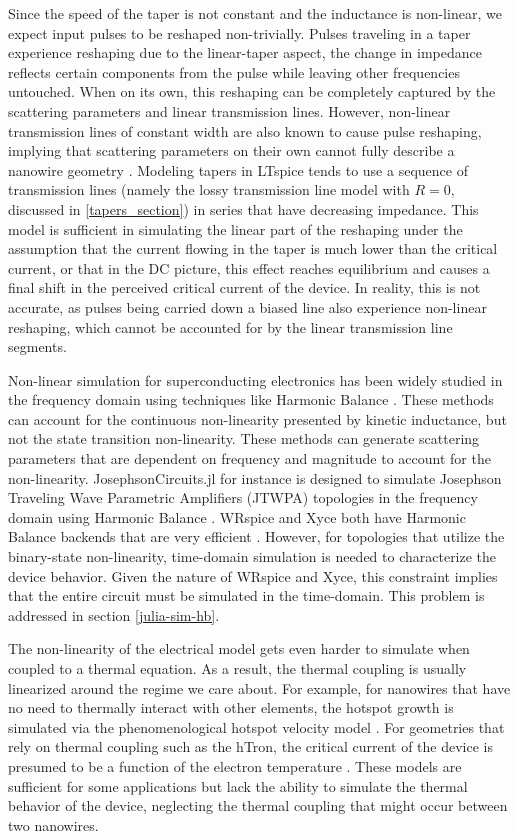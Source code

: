 Since the speed of the taper is not constant and the inductance is non-linear,
we expect input pulses to be reshaped non-trivially. Pulses traveling
in a taper experience reshaping due to the linear-taper aspect, the change in impedance
reflects certain components from the pulse while leaving other frequencies untouched.
When on its own, this reshaping can be completely captured by the scattering parameters and linear 
transmission lines. 
However,
non-linear transmission lines of constant width are also known to cause pulse reshaping, 
implying that scattering parameters on their own cannot fully describe a nanowire geometry
\cite{nl_tline_reshape}. 
Modeling tapers in LTspice tends to use a
sequence of transmission lines (namely the lossy transmission line model with $R=0$, 
discussed in \ref{tapers_section}) in series that have decreasing impedance. 
This model
is sufficient in simulating the linear part of the reshaping under the assumption
that the current flowing in the taper is much lower than the critical current, or
that in the DC picture, this effect reaches equilibrium and causes a final shift in the
perceived critical current of the device. In reality, this is not accurate, as pulses
being carried down a biased line also experience non-linear reshaping, which cannot
be accounted for by the linear transmission line segments.

Non-linear simulation for superconducting electronics has been widely studied in the 
frequency domain
using techniques like Harmonic Balance \cite{hb-book}. 
These methods can account for the continuous 
non-linearity presented by kinetic inductance, but not the state transition non-linearity.
These methods can generate scattering parameters that are dependent on frequency and
magnitude to account for the non-linearity.
JosephsonCircuits.jl for instance is designed
to simulate Josephson Traveling Wave Parametric Amplifiers (JTWPA) topologies in the frequency 
domain using Harmonic Balance \cite{josephsoncircsjl}. WRspice
and Xyce both have Harmonic Balance backends that are very efficient \cite{wrspice, xyce_reference}. However,
for topologies that utilize the binary-state non-linearity, time-domain simulation 
is needed to characterize the device behavior. Given the nature of WRspice and Xyce,
this constraint implies that the entire circuit must be simulated in the time-domain. This problem is
addressed in section \ref{julia-sim-hb}.

The non-linearity of the electrical model gets even harder to simulate when coupled to
a thermal equation. As a result, the thermal coupling is usually linearized around the 
regime we care about. For example, for nanowires that have no need to thermally
interact with other elements, the hotspot growth is simulated via the phenomenological
hotspot velocity model \cite{phen_model, matteo_thesis}. 
For geometries that rely on thermal coupling such as the hTron, the critical current
of the device is presumed to be a function of the electron temperature \cite{matteo_thesis}.
These models are sufficient for some applications but lack the ability to simulate the thermal behavior of the device,
neglecting the thermal coupling that might occur between two nanowires.

